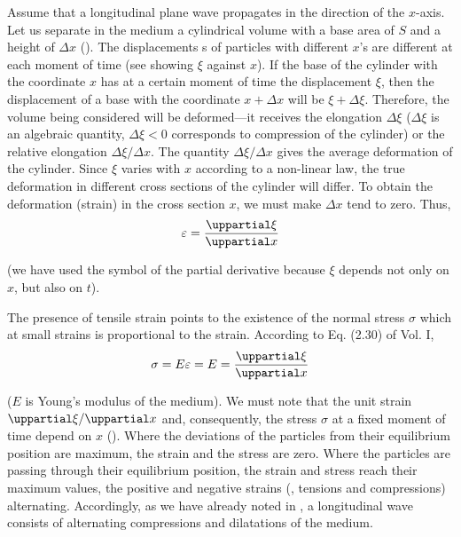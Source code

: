 Assume that a longitudinal plane wave propagates in the direction of the $x$-axis.
Let us separate in the medium a cylindrical volume with a base area of $S$ and a height of $\Delta{x}$ ().
The displacements s of particles with different $x$'s are different at each moment of time (see  showing $\xi$ against $x$).
If the base of the cylinder with the coordinate $x$ has at a certain moment of time the displacement $\xi$, then the displacement of a base with the coordinate $x+\Delta{x}$ will be $\xi+\Delta{\xi}$.
Therefore, the volume being considered will be deformed---it receives the elongation $\Delta{\xi}$ ($\Delta{\xi}$ is an algebraic quantity, $\Delta{\xi}<0$ corresponds to compression of the cylinder) or the relative elongation $\Delta{\xi}/\Delta{x}$.
The quantity $\Delta{\xi}/\Delta{x}$ gives the average deformation of the cylinder.
Since $\xi$ varies with $x$ according to a non-linear law, the true deformation in different cross sections of the cylinder will differ.
To obtain the deformation (strain) in the cross section $x$, we must make $\Delta{x}$ tend to zero.
Thus,
\begin{equation}\label{eq:14_30}
	\varepsilon = \diffpartial{\xi}{x}
\end{equation}

\noindent
(we have used the symbol of the partial derivative because $\xi$ depends not only on $x$, but also on $t$).

The presence of tensile strain points to the existence of the normal stress $\sigma$ which at small strains is proportional to the strain. According to Eq. (2.30) of Vol. I,
\begin{equation}\label{eq:14_31}
	\sigma = E \varepsilon = E = \diffpartial{\xi}{x}
\end{equation}

\noindent
($E$ is Young's modulus of the medium).
We must note that the unit strain $\diffpartialin{\xi}{x}$ and, consequently, the stress $\sigma$ at a fixed moment of time depend on $x$ ().
Where the deviations of the particles from their equilibrium position are maximum, the strain and the stress are zero.
Where the particles are passing through their equilibrium position, the strain and stress reach their maximum values, the positive and negative strains (\ie, tensions and compressions) alternating.
Accordingly, as we have already noted in , a longitudinal wave consists of alternating compressions and dilatations of the medium.

